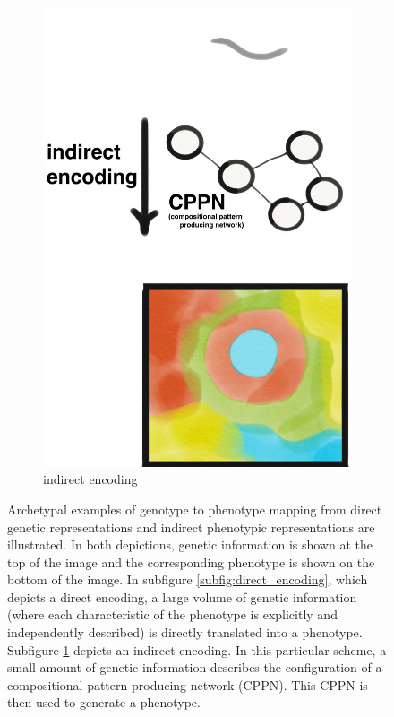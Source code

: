\begin{figure}
\begin{subfigure}[b]{0.4\textwidth}
        \includegraphics[width=\textwidth]{img/regular_indirect_encoding.png}
        \caption{indirect encoding}
        \label{subfig:indirect_encoding}
    \end{subfigure}
    \hfill
  \captionsetup{singlelinecheck=off,justification=raggedright}
  \caption[]{Archetypal examples of genotype to phenotype mapping from direct genetic representations and indirect phenotypic representations are illustrated. In both depictions, genetic information is shown at the top of the image and the corresponding phenotype is shown on the bottom of the image. In subfigure \ref{subfig:direct_encoding}, which depicts a direct encoding, a large volume of genetic information (where each characteristic of the phenotype is explicitly and independently described) is directly translated into a phenotype. Subfigure \ref{subfig:indirect_encoding} depicts an indirect encoding. In this particular scheme, a small amount of genetic information describes the configuration of a compositional pattern producing network (CPPN). This CPPN is then used to generate a phenotype.}
  \label{fig:indirect_bias}
\end{figure}
